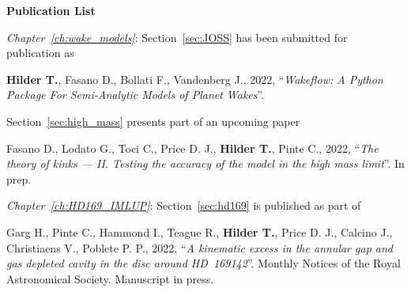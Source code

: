 {}

\begin{center}
    
    {\Large \textbf{Publication List}}
    
\end{center}

\setlength{\parindent}{0pt}

\vspace{0.5cm}

\textit{Chapter~\ref{ch:wake_models}}: \hspace{2pt}Section~\ref{sec:JOSS} has been submitted for publication as


\begin{myquote}{58pt}
    \textbf{Hilder T.}, Fasano D., Bollati F., Vandenberg J., 2022, ``\textit{Wakeflow: A Python Package For Semi-Analytic Models of Planet Wakes}''.
\end{myquote}

\hspace{58pt}Section~\ref{sec:high_mass} presents part of an upcoming paper

\begin{myquote}{58pt}
    Fasano D., Lodato G., Toci C., Price D. J., \textbf{Hilder T.}, Pinte C., 2022, ``\textit{The theory of kinks --- II. Testing the accuracy of the model in the high mass limit}''. In prep.
\end{myquote}

\vspace{0.5cm}

%
%

\textit{Chapter~\ref{ch:HD169_IMLUP}}: \hspace{2pt}Section~\ref{sec:hd169} is published as part of

\begin{myquote}{58pt}
    Garg H., Pinte C., Hammond I., Teague R., \textbf{Hilder T.}, Price D. J., Calcino J., Christiaens V., Poblete P. P., 2022, ``\textit{A kinematic excess in the annular gap and gas depleted cavity in the disc around HD~169142}''. Monthly Notices of the Royal Astronomical Society. Manuscript in press.
\end{myquote}

